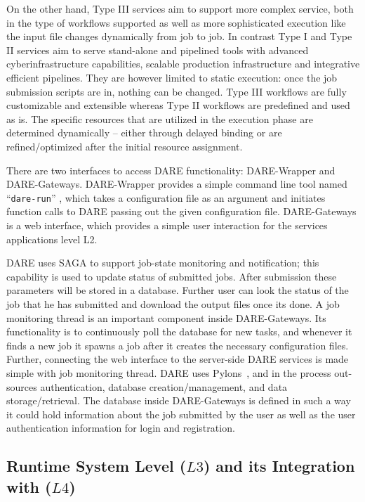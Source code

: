 \documentclass[]{svjour3}
\begin{document}
On the other hand, Type III services aim to support more complex
service, both in the type of workflows supported as well as more
sophisticated execution like the input file changes dynamically from
job to job. In contrast Type I and Type II services aim to serve
stand-alone and pipelined tools with advanced cyberinfrastructure
capabilities, scalable production infrastructure and integrative
efficient pipelines. They are however limited to static execution:
once the job submission scripts are in, nothing can be changed.  Type
III workflows are fully customizable and extensible whereas Type II
workflows are predefined and used as is.  The specific resources that
are utilized in the execution phase are determined dynamically --
either through delayed binding or are refined/optimized after the
initial resource assignment.

There are two interfaces to access DARE functionality: DARE-Wrapper
and DARE-Gateways.  DARE-Wrapper provides a simple command line tool
named ``\texttt{dare-run}'' , which takes a configuration file as an
argument and initiates function calls to DARE passing out the given
configuration file. DARE-Gateways is a web interface, which provides a
simple user interaction for the services applications level L2.

DARE uses SAGA to support job-state monitoring and notification; this
capability is used to update status of submitted jobs. After
submission these parameters will be stored in a database. Further user
can look the status of the job that he has submitted and download the
output files once its done.  A job monitoring thread is an important
component inside DARE-Gateways.  Its functionality is to continuously
poll the database for new tasks, and whenever it finds a new job it
spawns a job after it creates the necessary configuration files.
Further, connecting the web interface to the server-side DARE services
is made simple with job monitoring thread.  DARE uses
Pylons~\cite{pylons_website}, and in the process out-sources
authentication, database creation/management, and data
storage/retrieval.  The database inside DARE-Gateways is defined in
such a way it could hold information about the job submitted by the
user as well as the user authentication information for login and
registration.

\subsection{Runtime System Level ($L3$) and its Integration with
  ($L4$)}
\end{document}
